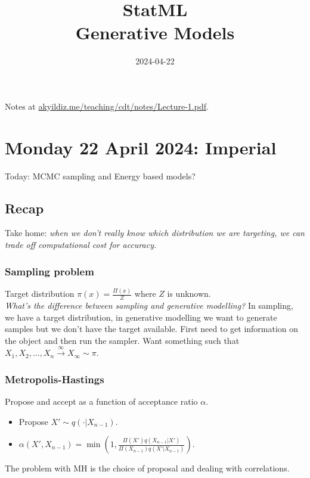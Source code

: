 \documentclass{article}
\date{2024-04-22}
\title{StatML\\Generative Models}
\begin{document}
  \maketitle
  \tableofcontents

  \newpage

  Notes at \url{akyildiz.me/teaching/cdt/notes/Lecture-1.pdf}.

  \section{Monday 22 April 2024: Imperial}

  Today: MCMC sampling and Energy based models? \\

  \subsection{Recap}

  Take home: \textit{when we don't really know which distribution we are targeting, we can trade off computational cost for accuracy.}


  \subsubsection{Sampling problem} 
  Target distribution $\pi(x) = \frac{\Pi(x)}{Z}$ where $Z$ is unknown.
  \\
  \textit{
  What's the difference between sampling and generative modelling?} 
      In sampling, we have a target distribution, in generative modelling we want to generate samples but we don't have the target available.  
      First need to get information on the object and then run the sampler.
      Want something such that $X_1, X_2, \dots, X_n \xrightarrow \infty X_{\infty} \sim \pi$.

    \subsubsection{Metropolis-Hastings}

    Propose and accept as a function of acceptance ratio $\alpha$.
    \begin{itemize}
        \item Propose $X' \sim q(\cdot | X_{n-1})$.
        \item $\alpha(X', X_{n-1}) = \min \left( 1, \frac{\Pi(X')q(X_{n-1}|X')}{\Pi(X_{n-1})q(X'|X_{n-1})} \right).$
    \end{itemize}
    The problem with MH is the choice of proposal and dealing with correlations.
\end{document}
